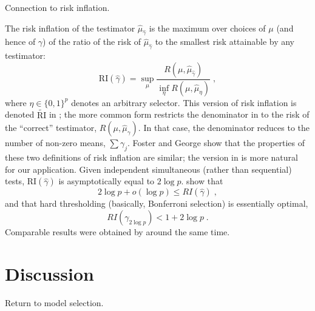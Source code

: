 \documentclass[12pt]{article}
\begin{document}
 {\ras Connection to risk inflation.}

 The risk inflation of the testimator
 $\hat\mu_{\hat\gamma}$ is the maximum over choices of $\mu$ (and hence of
 $\gamma$) of the ratio of the risk of $\hat\mu_{\hat\gamma}$ to the smallest
 risk attainable by any testimator:
 \begin{equation}
    \mbox{RI}(\hat\gamma) 
          = \sup_\mu  \frac{R(\mu, \hat\mu_{\hat\gamma})}
                           {\inf_\eta{R(\mu, \hat\mu_\eta)}}   \;,
 \label{eq:ri}
 \end{equation}
 where $\eta \in \{0,1\}^p$ denotes an arbitrary selector.  This version of risk
 inflation is denoted $\widetilde{\mbox{RI}}$ in \citet{fostergeorge94}; the
 more common form restricts the denominator in  to the risk of the
 ``correct'' testimator, $R(\mu, \hat\mu_\gamma)$.  In that case, the
 denominator reduces to the number of non-zero means, $\sum \gamma_j$.  Foster
 and George show that the properties of these two definitions of risk inflation
 are similar; the version in  is more natural for our application.
  Given independent simultaneous (rather than sequential) tests,
 RI$(\hat\gamma)$ is asymptotically equal to $2 \log p$.  \citet{fostergeorge94}
 show that
 \begin{equation}
     2 \log p + o(\log p) \le  RI(\hat\gamma) \;,
 \label{eq:lower}
 \end{equation}
 and that hard thresholding (basically, Bonferroni selection) is essentially optimal,
 \begin{equation}
       RI(\gamma_{2 \log p}) < 1 + 2 \log p \;.
 \label{eq:upper}
 \end{equation}
 Comparable results were obtained by \citet{donohojohnstone94} around the same time. 



\section{ Discussion }


 Return to model selection.
\end{document}
